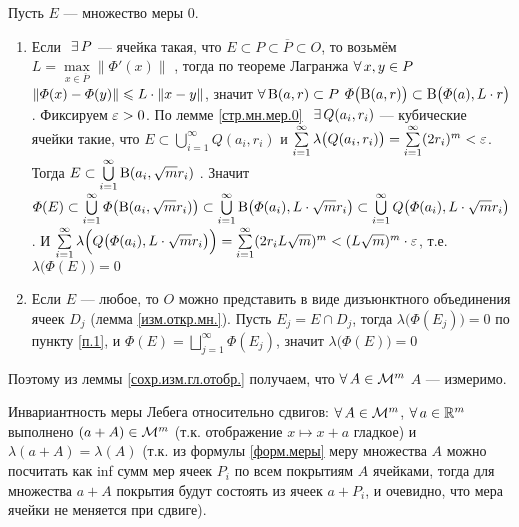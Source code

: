 \begin{prf}
	Пусть $E$ --- множество меры 0.
	\begin{enumerate}
	\item \label{п.1}Если$\E P$ --- ячейка такая, что $E \subset P \subset \overline P \subset O$, то возьмём $L = \max\limits_{x \in \overline{P}} \|\varPhi'(x)\|$ , тогда по теореме Лагранжа $\forall \, x, y \in P$ $\|\varPhi(x) - \varPhi(y) \|\leqslant L\cdot \|x - y\|$, значит $\forall \, \mathrm B(a, r) \subset P$ $\varPhi\bigl(\mathrm B(a, r)\bigr) \subset \mathrm B\bigl(\varPhi(a), L \cdot r\bigr)$. Фиксируем $\varepsilon > 0$. По лемме \ref{стр.мн.мер.0}$\E Q(a_i, r_i)$ --- кубические ячейки такие, что $E \subset \bigcup\limits_{i = 1}^\infty Q(a_i, r_i)$ и $\sum\limits_{i = 1}^\infty \lambda\bigl(Q(a_i, r_i)\bigr) = \sum\limits_{i = 1}^\infty(2r_i)^m < \varepsilon$. Тогда $E \subset \bigcup\limits_{i = 1}^\infty \mathrm B(a_i, \sqrt m r_i)$ . Значит $\varPhi(E) \subset \bigcup\limits_{i = 1}^\infty \varPhi\bigl( \mathrm B(a_i, \sqrt m r_i)\bigr) \subset \bigcup\limits_{i = 1}^\infty \mathrm B\bigl(\varPhi(a_i), L \cdot \sqrt m r_i\bigr) \subset \bigcup\limits_{i = 1}^\infty Q\bigl(\varPhi(a_i), L \cdot \sqrt m r_i\bigr)$. И $\sum\limits_{i = 1}^\infty \lambda \Bigl(Q\bigl(\varPhi(a_i), L \cdot \sqrt m r_i\bigr)\Bigr) = \sum\limits_{i = 1}^\infty (2r_iL\sqrt{m})^m < (L\sqrt m)^m \cdot\varepsilon$, т.е. $\lambda\bigl(\varPhi(E)\bigr) = 0$
	
	\item Если $E$ --- любое, то $O$ можно представить в виде дизъюнктного объединения ячеек $D_j$ (лемма \ref{изм.откр.мн.}). Пусть $E_j = E \cap D_j$, тогда  $\lambda\bigl(\varPhi(E_j)\bigr) = 0$ по пункту \ref{п.1}, и $\varPhi(E) = \bigsqcup\limits_{j = 1}^\infty \varPhi(E_j)$, значит  $\lambda\bigl(\varPhi(E)\bigr) = 0$
	\end{enumerate}
	\hspace{20pt}Поэтому из леммы \ref{сохр.изм.гл.отобр.} получаем, что $\forall \, A \in \mathcal{M}^m$ $A$ --- измеримо.
\end{prf}

\begin{slv}[https://www.youtube.com/live/Y10gq1j3ADI?si=jLLGymkDBW3xE0TH&t=8149]\label{инв.отн.сдв.}
	Инвариантность меры Лебега относительно сдвигов: $\forall \, A \in \mathcal{M}^m$, $\forall \, a \in \mathbb R^m$ выполнено $(a + A) \in \mathcal{M}^m$ (т.к. отображение $x \mapsto x + a$ гладкое) и $\lambda(a+ A) = \lambda(A)$ (т.к. из формулы \ref{форм.меры} меру множества $A$ можно посчитать как inf сумм мер ячеек $P_i$ по всем покрытиям $A$ ячейками, тогда для множества $a + A$ покрытия будут состоять из ячеек $a + P_i$, и очевидно, что мера ячейки не меняется при сдвиге).
\end{slv}

